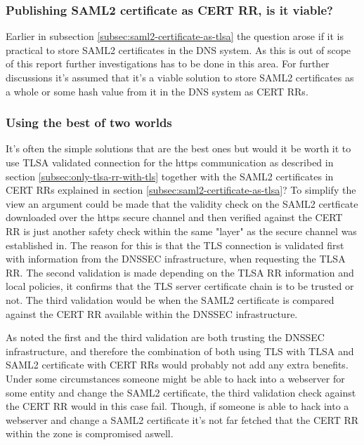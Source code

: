 
\subsubsection{Publishing SAML2 certificate as CERT RR, is it viable?}
\label{subsec:saml2-certs-in-cert-rr}
Earlier in subsection \ref{subsec:saml2-certificate-as-tlsa} the question arose if it is practical to store SAML2 certificates in the DNS system.
As this is out of scope of this report further investigations has to be done in this area.
For further discussions it's assumed that it's a viable solution to store SAML2 certificates as a whole or some hash value from it in the DNS system as CERT RRs.

\subsubsection{Using the best of two worlds}
It's often the simple solutions that are the best ones but would it be worth it to use TLSA validated connection for the https communication as described in section \ref{subsec:only-tlsa-rr-with-tls} together with the SAML2 certificates in CERT RRs explained in section \ref{subsec:saml2-certificate-as-tlsa}?
To simplify the view an argument could be made that the validity check on the SAML2 certficate downloaded over the https secure channel and then verified against the CERT RR is just another safety check within the same "layer" as the secure channel was established in.
The reason for this is that the TLS connection is validated first with information from the DNSSEC infrastructure, when requesting the TLSA RR.
The second validation is made depending on the TLSA RR information and local policies, it confirms that the TLS server certificate chain is to be trusted or not.
The third validation would be when the SAML2 certificate is compared against the CERT RR available within the DNSSEC infrastructure.

As noted the first and the third validation are both trusting the DNSSEC infrastructure, and therefore the combination of both using TLS with TLSA and SAML2 certificate with CERT RRs would probably not add any extra benefits.
Under some circumstances someone might be able to hack into a webserver for some entity and change the SAML2 certificate, the third validation check against the CERT RR would in this case fail.
Though, if someone is able to hack into a webserver and change a SAML2 certificate it's not far fetched that the CERT RR within the zone is compromised aswell.
